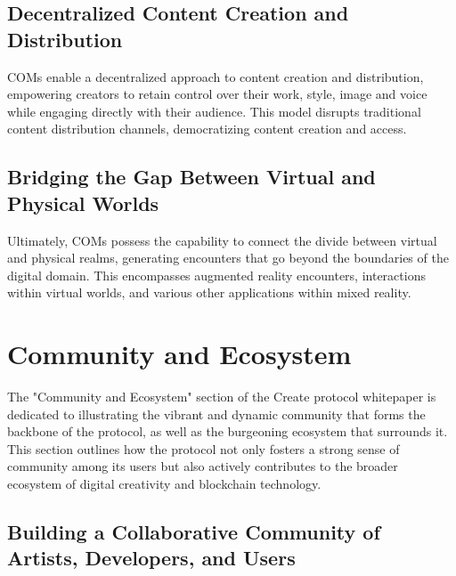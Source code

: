 \documentclass[12pt,a4paper]{article}
\begin{document}
\subsection{Decentralized Content Creation and Distribution}

COMs enable a decentralized approach to content creation and distribution, empowering creators to retain control over their work, style, image and voice while engaging directly with their audience. This model disrupts traditional content distribution channels, democratizing content creation and access.

\subsection{Bridging the Gap Between Virtual and Physical Worlds}

Ultimately, COMs possess the capability to connect the divide between virtual and physical realms, generating encounters that go beyond the boundaries of the digital domain. This encompasses augmented reality encounters, interactions within virtual worlds, and various other applications within mixed reality.

\noindent{}

\pagebreak

\section{Community and Ecosystem}

The "Community and Ecosystem" section of the Create protocol whitepaper is dedicated to illustrating the vibrant and dynamic community that forms the backbone of the protocol, as well as the burgeoning ecosystem that surrounds it. This section outlines how the protocol not only fosters a strong sense of community among its users but also actively contributes to the broader ecosystem of digital creativity and blockchain technology.

\subsection{Building a Collaborative Community of Artists, Developers, and Users}
\end{document}
